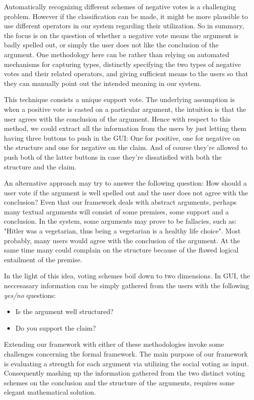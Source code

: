 \documentclass{article}
\begin{document}
Automatically recognizing different schemes of negative votes is a challenging problem. However if the classification can be made, it might be more plausible to use different operators in our system regarding their utilization. So in summary, the focus is on the question of whether a negative vote means the argument is badly spelled out, or simply the user does not like the conclusion of  the argument. One methodology here can be rather than relying on automated mechanisms for capturing types, distinctly specifying the two types of negative votes and their related operators, and giving sufficient means to the users so that they can manually point out the intended meaning in our system. 

This technique consists a unique support vote. The underlying assumption is when a positive vote is casted on a particular argument, the intuition is that the user agrees with the conclusion of the argument. Hence with respect to this method, we could extract all the information from the users by just letting them having three buttons to push in the GUI: One for positive, one for negative on the structure and one for negative on the claim. And of course they're allowed to push both of the latter buttons in case they're dissatisfied with both the structure and the claim.

An alternative approach may try to answer the following question: How should a user vote if the argument is well spelled out and the user does not agree with the conclusion? Even that our framework deals with abstract arguments, perhaps many textual arguments will consist of some premises, some support and a conclusion. In the system, some arguments may prove to be fallacies, such as: "Hitler was a vegetarian, thus being a vegetarian is a healthy life choice".  Most probably, many users would agree with the conclusion of the argument. At the same time many could complain on the structure because of the flawed logical entailment of  the premise.

In the light of this idea, voting schemes boil down to two dimensions. In GUI, the neccesasary information can be simply gathered from the users with the following \textit{yes/no} questions:
\begin {itemize}
\item Is the argument well structured?
\item Do you support the claim?
\end{itemize}


Extending our framework with either of these methodologies invoke some challenges concerning the formal framework. The main purpose of our framework is evaluating a strength for each argument via utilizing the social voting as input. Consequently mashing up the information gathered from the two distinct voting schemes on the conclusion and the structure of the arguments, requires some elegant mathematical solution.
\end{document}
